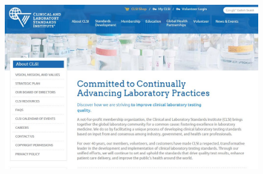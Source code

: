 \documentclass[compress]{beamer}        %
\begin{document}
\begin{frame}
	\begin{figure}
\centering
\includegraphics[width=1.1\linewidth]{images/CLSIWebsite}
\end{figure}

\end{frame}		
\end{document}
